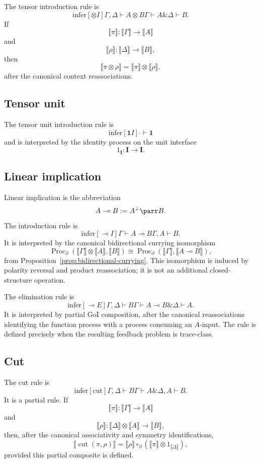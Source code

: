 The tensor introduction rule is
\[
\mathrm{infer}[\otimes I]
      {\Gamma,\Delta\vdash A\otimes B}
      {\Gamma\vdash A \& \Delta\vdash B}.
\]
If
\[
\llbracket \pi\rrbracket:
\llbracket\Gamma\rrbracket\to\llbracket A\rrbracket
\]
and
\[
\llbracket \rho\rrbracket:
\llbracket\Delta\rrbracket\to\llbracket B\rrbracket,
\]
then
\[
\llbracket \pi\otimes\rho\rrbracket
=
\llbracket \pi\rrbracket\otimes\llbracket \rho\rrbracket,
\]
after the canonical context reassociations.

\subsection{Tensor unit}

The tensor unit introduction rule is
\[
\mathrm{infer}[\mathbf 1 I]
      {\cdot\vdash\mathbf 1}
      {}
\]
and is interpreted by the identity process on the unit interface
\[
1_{\mathbf I}:\mathbf I\to\mathbf I.
\]

\subsection{Linear implication}

Linear implication is the abbreviation
\[
A\multimap B:=A^\bot\parr B.
\]
The introduction rule is
\[
\mathrm{infer}[\multimap I]
      {\Gamma\vdash A\multimap B}
      {\Gamma,A\vdash B}.
\]
It is interpreted by the canonical bidirectional currying isomorphism
\[
\operatorname{Proc}_{\partial}
(\llbracket\Gamma\rrbracket\otimes\llbracket A\rrbracket,
 \llbracket B\rrbracket)
\cong
\operatorname{Proc}_{\partial}
(\llbracket\Gamma\rrbracket,
 \llbracket A\multimap B\rrbracket),
\]
from Proposition~\ref{prop:bidirectional-currying}.  This isomorphism is
induced by polarity reversal and product reassociation; it is not an additional
closed-structure operation.

The elimination rule is
\[
\mathrm{infer}[\multimap E]
      {\Gamma,\Delta\vdash B}
      {\Gamma\vdash A\multimap B \& \Delta\vdash A}.
\]
It is interpreted by partial GoI composition, after the canonical
reassociations identifying the function process with a process consuming an
\(A\)-input.  The rule is defined precisely when the resulting feedback
problem is trace-class.

\subsection{Cut}

The cut rule is
\[
\mathrm{infer}[\mathrm{cut}]
      {\Gamma,\Delta\vdash B}
      {\Gamma\vdash A \& \Delta,A\vdash B}.
\]
It is a partial rule.  If
\[
\llbracket\pi\rrbracket:
\llbracket\Gamma\rrbracket\to\llbracket A\rrbracket
\]
and
\[
\llbracket\rho\rrbracket:
\llbracket\Delta\rrbracket\otimes\llbracket A\rrbracket
\to
\llbracket B\rrbracket,
\]
then, after the canonical associativity and symmetry identifications,
\[
\llbracket \operatorname{cut}(\pi,\rho)\rrbracket
=
\llbracket\rho\rrbracket
\circ_{\partial}
(\llbracket\pi\rrbracket\otimes 1_{\llbracket\Delta\rrbracket}),
\]
provided this partial composite is defined.

